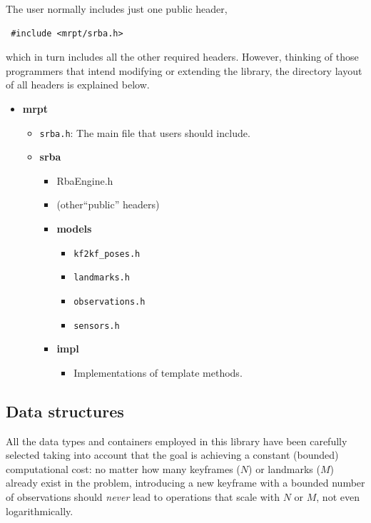\documentclass[a4paper,11pt]{article}
\begin{document}
The user normally includes just one public header,

\begin{lstlisting}
 #include <mrpt/srba.h>
\end{lstlisting}

\noindent which in turn includes all the other required headers. 
However, thinking of those programmers that intend modifying or extending the library, 
the directory layout of all headers is explained below. 

\begin{itemize}[label=$\rhd$]
  \item{\textbf{mrpt}
    \begin{itemize}[label=$\rhd$]
    \item{\texttt{srba.h}: The main file that users should include.}
    \item{\textbf{srba}
      \begin{itemize}[label=$\rhd$]
      \item{RbaEngine.h}
      \item{(other``public'' headers)}
      \item{\textbf{models}
	\begin{itemize}[label=$\rhd$]
	  \item \texttt{kf2kf\_poses.h}
	  \item \texttt{landmarks.h}
	  \item \texttt{observations.h}
	  \item \texttt{sensors.h}
	\end{itemize}
      }
      \item{\textbf{impl}
	\begin{itemize}[label=$\rhd$]
	\item Implementations of template methods.
	\end{itemize}
	}
      \end{itemize}
    }
    \end{itemize}
  }
\end{itemize}



\subsection{Data structures}
\label{sect:data.structs}

All the data types and containers employed in this library 
have been carefully selected taking into account that the goal
is achieving a constant (bounded) computational cost: no matter 
how many keyframes ($N$) or landmarks ($M$) already exist in the problem, 
introducing a new keyframe with a bounded number of observations
should \emph{never} lead to operations that scale with $N$ or $M$, not even logarithmically.
\end{document}
